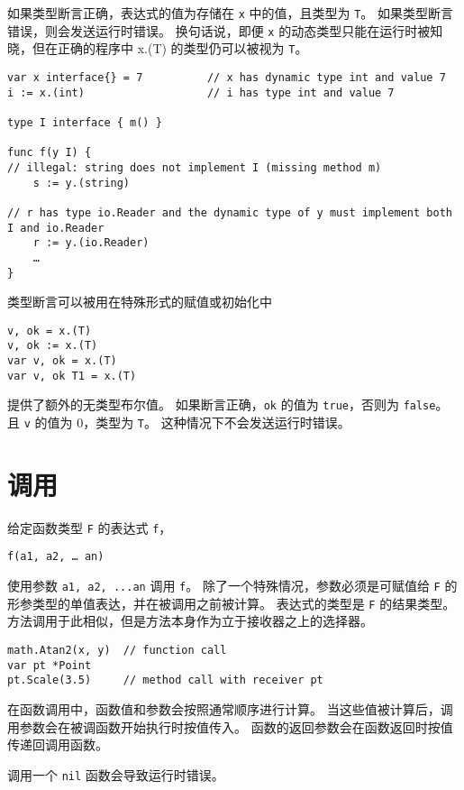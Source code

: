 如果类型断言正确，表达式的值为存储在 \lstinline|x| 中的值，且类型为 \lstinline|T|。
如果类型断言错误，则会发送运行时错误。
换句话说，即便 \lstinline|x| 的动态类型只能在运行时被知晓，但在正确的程序中 x.(T) 的类型仍可以被视为 \lstinline|T|。
\begin{lstlisting}[style=golang]
var x interface{} = 7          // x has dynamic type int and value 7
i := x.(int)                   // i has type int and value 7

type I interface { m() }

func f(y I) {
// illegal: string does not implement I (missing method m)
	s := y.(string)

// r has type io.Reader and the dynamic type of y must implement both I and io.Reader 
	r := y.(io.Reader)
	…
}
\end{lstlisting}

类型断言可以被用在特殊形式的赋值或初始化中
\begin{lstlisting}[style=golang]
v, ok = x.(T)
v, ok := x.(T)
var v, ok = x.(T)
var v, ok T1 = x.(T)
\end{lstlisting}
提供了额外的无类型布尔值。
如果断言正确，\lstinline|ok| 的值为 \lstinline|true|，否则为 \lstinline|false|。
且 \lstinline|v| 的值为 0，类型为 \lstinline|T|。
这种情况下不会发送运行时错误。


\section{调用}
给定函数类型 \lstinline|F| 的表达式 \lstinline|f|，
\begin{lstlisting}[style=golang]
f(a1, a2, … an)
\end{lstlisting}
使用参数 \lstinline|a1, a2, ...an| 调用 \lstinline|f|。
除了一个特殊情况，参数必须是可赋值给 \lstinline|F| 的形参类型的单值表达，并在被调用之前被计算。
表达式的类型是 \lstinline|F| 的结果类型。
方法调用于此相似，但是方法本身作为立于接收器之上的选择器。
\begin{lstlisting}[style=golang]
math.Atan2(x, y)  // function call
var pt *Point
pt.Scale(3.5)     // method call with receiver pt
\end{lstlisting}

在函数调用中，函数值和参数会按照通常顺序进行计算。
当这些值被计算后，调用参数会在被调函数开始执行时按值传入。
函数的返回参数会在函数返回时按值传递回调用函数。

调用一个 \lstinline|nil| 函数会导致运行时错误。

